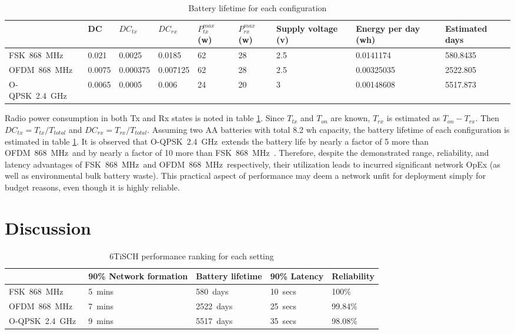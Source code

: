 \documentclass[journal]{IEEEtran}
\newcommand{\fsk}          {FSK~868~MHz}
\newcommand{\oqpsk}        {O-QPSK~2.4~GHz}
\newcommand{\ofdm}         {OFDM~868~MHz}
\begin{document}
\begin{table}[]
\centering
\begin{tabular}{|l|l|l|l|l|l|l|l|l|}
\hline
        & DC     & $DC_{tx}$ & $DC_{rx}$ & $P_{tx}^{max}$ (w) & $P_{rx}^{max}$(w) & Supply voltage (v) & Energy per day (wh) & \textbf{Estimated days} \\ \hline
\fsk\   & 0.021  & 0.0025    & 0.0185    & 62             & 28             & 2.5            & 0.0141174           & 580.8435       \\ \hline
\ofdm\  & 0.0075 & 0.000375  & 0.007125  & 62             & 28             & 2.5            & 0.00325035          & 2522.805       \\ \hline
\oqpsk\ & 0.0065 & 0.0005    & 0.006     & 24             & 20             & 3              & 0.00148608          & 5517.873       \\ \hline
\end{tabular}
\caption{Battery lifetime for each configuration}
\label{tab:energy_table}
\end{table}


Radio power consumption in both Tx and Rx states is noted in table \ref{tab:energy_table}.
Since $T_{tx}$ and $T_{on}$ are known, $T_{rx}$ is estimated as $T_{on}-T_{rx}$.
Then $DC_{tx}=T_{tx}/T_{total}$ and $DC_{rx}=T_{rx}/T_{total}$.
Assuming two AA batteries with total 8.2 wh capacity, the battery lifetime of each configuration is estimated in table \ref{tab:energy_table}.
It is observed that \oqpsk\ extends the battery life by nearly a factor of 5 more than \ofdm\ and by nearly a factor of 10  more than \fsk\ .
Therefore, despite the demonstrated range, reliability, and latency advantages of \fsk\ and \ofdm\ respectively, their utilization leads to incurred significant network OpEx (as well as environmental bulk battery waste).
This practical aspect of performance may deem a network unfit for deployment simply for budget reasons, even though it is highly reliable. 

\section{Discussion}
\label{sec:discussion}

\begin{table}[]
    \centering
    \begin{tabular}{|l|l|l|l|l|}
        \hline
                & 90\% Network formation & Battery lifetime & 90\% Latency  &  Reliability   \\ \hline
        \fsk\   & 5~mins                 & 580~days      & 10~secs       & 100\%             \\ \hline
        \ofdm\  & 7~mins                 & 2522~days     & 25~secs       & 99.84\%           \\ \hline
        \oqpsk\ & 9~mins                 & 5517~days     & 35~secs       & 98.08\%           \\ \hline
    \end{tabular}
    \caption{6TiSCH performance ranking for each setting}
    \label{tab:summary}
\end{table}
\end{document}
